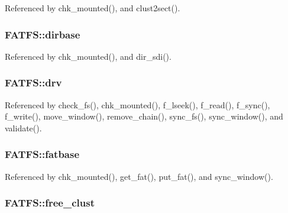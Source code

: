 Referenced by chk\-\_\-mounted(), and clust2sect().

\hypertarget{structFATFS_a3f72fd998dbcce4652a85a81fe944bc4}{
\subsubsection[{dirbase}]{ F\-A\-T\-F\-S\-::dirbase}}\label{structFATFS_a3f72fd998dbcce4652a85a81fe944bc4}


Referenced by chk\-\_\-mounted(), and dir\-\_\-sdi().

\hypertarget{structFATFS_a6a791560e2687e8b1569bfce61208d2d}{
\subsubsection[{drv}]{ F\-A\-T\-F\-S\-::drv}}\label{structFATFS_a6a791560e2687e8b1569bfce61208d2d}


Referenced by check\-\_\-fs(), chk\-\_\-mounted(), f\-\_\-lseek(), f\-\_\-read(), f\-\_\-sync(), f\-\_\-write(), move\-\_\-window(), remove\-\_\-chain(), sync\-\_\-fs(), sync\-\_\-window(), and validate().

\hypertarget{structFATFS_a848fba02c4aabe02ef2984e578f33d64}{
\subsubsection[{fatbase}]{ F\-A\-T\-F\-S\-::fatbase}}\label{structFATFS_a848fba02c4aabe02ef2984e578f33d64}


Referenced by chk\-\_\-mounted(), get\-\_\-fat(), put\-\_\-fat(), and sync\-\_\-window().

\hypertarget{structFATFS_a5fb49e6ac511bd97eaffdd636d0e4165}{
\subsubsection[{free\-\_\-clust}]{ F\-A\-T\-F\-S\-::free\-\_\-clust}}\label{structFATFS_a5fb49e6ac511bd97eaffdd636d0e4165}


